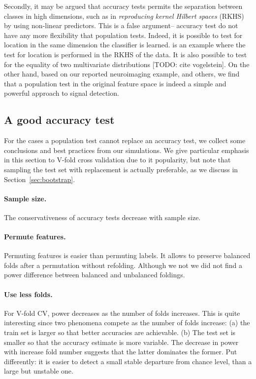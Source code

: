 \documentclass[12pt,a4paper]{article}
\theoremstyle{definition}
\begin{document}
Secondly, it may be argued that accuracy tests permits the separation between classes in high dimensions, such as in \emph{reproducing kernel Hilbert spaces} (RKHS) by using non-linear predictors. 
This is a false argument-- accuracy test do not have any more flexibility that population tests. 
Indeed, it is possible to test for location in the same dimension the classifier is learned. 
\citet{gretton_kernel_2012-1} is an example where the test for location is performed in the RKHS of the data.
It is also possible to test for the equality of two multivariate distributions [TODO: cite  vogelstein].
On the other hand, based on our reported neuroimaging example, and others, we find that a population test in the original feature space is indeed a simple and powerful approach to signal detection.







\subsection{A good accuracy test}
For the cases a population test cannot replace an accuracy test, we collect some conclusions and best practices from our simulations.
We give particular emphasis in this section to V-fold cross validation due to it popularity, but note that sampling the test set with replacement is actually preferable, as we discuss in Section~\ref{sec:bootstrap}.

\paragraph{Sample size.} The conservativeness of accuracy tests decrease with sample size. 

\paragraph{Permute features.} Permuting features is easier than permuting labels. 
It allows to preserve balanced folds after a permutation without refolding.
Although we not we did not find a power difference between balanced and unbalanced foldings. 

\paragraph{Use less folds.} For V-fold CV, power decreases as the number of folds increases. 
This is quite interesting since two phenomena compete as the number of folds increase:
(a) the train set is larger so that better accuracies are achievable. 
(b) The test set is smaller so that the accuracy estimate is more variable. 
The decrease in power with increase fold number suggests that the latter dominates the former. 
Put differently: it is easier to detect a small stable departure from chance level, than a large but unstable one.
\end{document}
